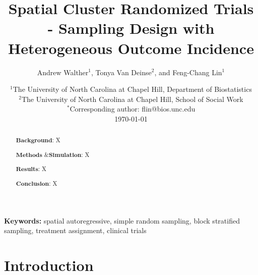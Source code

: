 \documentclass{article}[11pt]
\newcommand{\keywords}[1]{%
  \noindent\textbf{Keywords:} #1%
}
\begin{document}
\linenumbers
\title{Spatial Cluster Randomized Trials - Sampling Design with Heterogeneous Outcome Incidence}
\author{Andrew Walther$^1$, Tonya Van Deinse$^2$, and Feng-Chang Lin$^1$}
\date{
    $^1$The University of North Carolina at Chapel Hill, Department of Biostatistics\\
    $^2$The University of North Carolina at Chapel Hill, School of Social Work\\%
    $^*$Corresponding author: flin@bios.unc.edu\\
    \today
}




\maketitle

\keywords{spatial autoregressive, simple random sampling, block stratified sampling, treatment assignment, clinical trials} 

\vspace{1em} %


\begin{abstract}
   $\textbf{Background}$: X

   $\textbf{Methods \& Simulation}$: X

   $\textbf{Results}$: X

   $\textbf{Conclusion}$: X
\end{abstract}

\section{Introduction}
\end{document}
